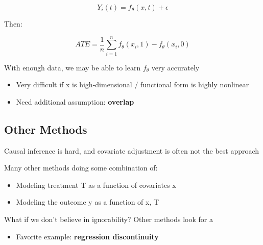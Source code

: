 \documentclass[
  letterpaper,
  DIV=11,
  numbers=noendperiod]{scrreprt}
\providecommand{\tightlist}{%
  \setlength{\itemsep}{0pt}\setlength{\parskip}{0pt}}\usepackage{longtable,booktabs,array}
\begin{document}
\[Y_{i}(t) = f_{\theta}(x, t) + \epsilon\]

Then:

\[ATE = \frac{1}{n}\sum_{i=1}^{n}{f_{\theta}(x_i, 1) - f_{\theta}(x_i, 0)}\]

With enough data, we may be able to learn \(f_{\theta}\) very accurately

\begin{itemize}
\tightlist
\item
  Very difficult if x is high-dimensional / functional form is highly
  nonlinear
\item
  Need additional assumption: \textbf{overlap}
\end{itemize}

\hypertarget{other-methods}{%
\subsection{Other Methods}\label{other-methods}}

Causal inference is hard, and covariate adjustment is often not the best
approach

Many other methods doing some combination of:

\begin{itemize}
\tightlist
\item
  Modeling treatment T as a function of covariates x
\item
  Modeling the outcome y as a function of x, T
\end{itemize}

What if we don't believe in ignorability? Other methods look for a

\begin{itemize}
\tightlist
\item
  Favorite example: \textbf{regression discontinuity}
\end{itemize}
\end{document}

